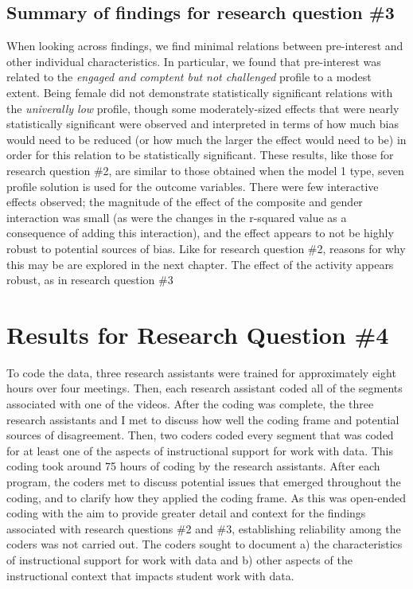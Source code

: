\documentclass[]{msu-thesis}
\theoremstyle{definition}
\theoremstyle{definition}
\theoremstyle{definition}
\theoremstyle{remark}
\begin{document}
\subsection{Summary of findings for research question
\#3}\label{summary-of-findings-for-research-question-3}

When looking across findings, we find minimal relations between
pre-interest and other individual characteristics. In particular, we
found that pre-interest was related to the \emph{engaged and comptent
but not challenged} profile to a modest extent. Being female did not
demonstrate statistically significant relations with the
\emph{univerally low} profile, though some moderately-sized effects that
were nearly statistically significant were observed and interpreted in
terms of how much bias would need to be reduced (or how much the larger
the effect would need to be) in order for this relation to be
statistically significant. These results, like those for research
question \#2, are similar to those obtained when the model 1 type, seven
profile solution is used for the outcome variables. There were few
interactive effects observed; the magnitude of the effect of the
composite and gender interaction was small (as were the changes in the
r-squared value as a consequence of adding this interaction), and the
effect appears to not be highly robust to potential sources of bias.
Like for research question \#2, reasons for why this may be are explored
in the next chapter. The effect of the activity appears robust, as in
research question \#3

\section{Results for Research Question
\#4}\label{results-for-research-question-4}

To code the data, three research assistants were trained for
approximately eight hours over four meetings. Then, each research
assistant coded all of the segments associated with one of the videos.
After the coding was complete, the three research assistants and I met
to discuss how well the coding frame and potential sources of
disagreement. Then, two coders coded every segment that was coded for at
least one of the aspects of instructional support for work with data.
This coding took around 75 hours of coding by the research assistants.
After each program, the coders met to discuss potential issues that
emerged throughout the coding, and to clarify how they applied the
coding frame. As this was open-ended coding with the aim to provide
greater detail and context for the findings associated with research
questions \#2 and \#3, establishing reliability among the coders was not
carried out. The coders sought to document a) the characteristics of
instructional support for work with data and b) other aspects of the
instructional context that impacts student work with data.
\end{document}
